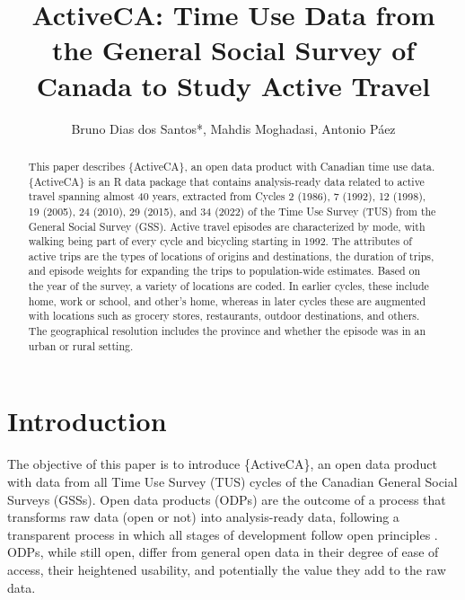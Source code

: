 \documentclass[Royal,times,sageh]{sagej}
\begin{document}

\title{ActiveCA: Time Use Data from the General Social Survey of Canada
to Study Active Travel}


\author{Bruno Dias dos Santos*, Mahdis
Moghadasi, Antonio Páez}




\begin{abstract}
This paper describes \{ActiveCA\}, an open data product with Canadian
time use data. \{ActiveCA\} is an R data package that contains
analysis-ready data related to active travel spanning almost 40 years,
extracted from Cycles 2 (1986), 7 (1992), 12 (1998), 19 (2005), 24
(2010), 29 (2015), and 34 (2022) of the Time Use Survey (TUS) from the
General Social Survey (GSS). Active travel episodes are characterized by
mode, with walking being part of every cycle and bicycling starting in
1992. The attributes of active trips are the types of locations of
origins and destinations, the duration of trips, and episode weights for
expanding the trips to population-wide estimates. Based on the year of
the survey, a variety of locations are coded. In earlier cycles, these
include home, work or school, and other's home, whereas in later cycles
these are augmented with locations such as grocery stores, restaurants,
outdoor destinations, and others. The geographical resolution includes
the province and whether the episode was in an urban or rural setting.
\end{abstract}


\maketitle

\section{Introduction}\label{introduction}

The objective of this paper is to introduce \{ActiveCA\}, an open data
product with data from all Time Use Survey (TUS) cycles of the Canadian
General Social Surveys (GSSs). Open data products (ODPs) are the outcome
of a process that transforms raw data (open or not) into analysis-ready
data, following a transparent process in which all stages of development
follow open principles \citep{arribas-bel2021}. ODPs, while still open,
differ from general open data in their degree of ease of access, their
heightened usability, and potentially the value they add to the raw
data.
\end{document}
